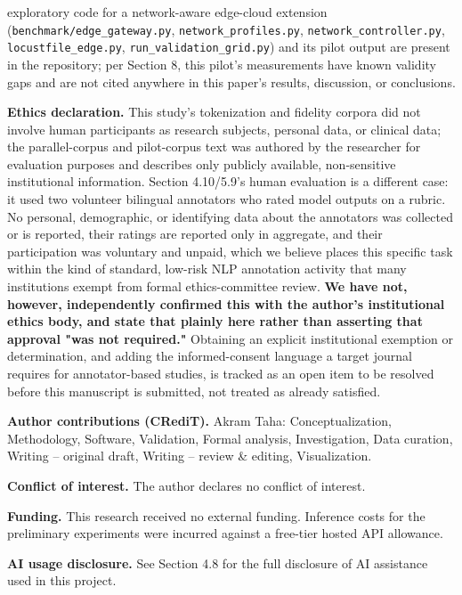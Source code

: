 exploratory code for a network-aware edge-cloud extension (\texttt{benchmark/edge\_gateway.py}, \texttt{network\_profiles.py}, \texttt{network\_controller.py}, \texttt{locustfile\_edge.py}, \texttt{run\_validation\_grid.py}) and its pilot output are present in the repository; per Section 8, this pilot's measurements have known validity gaps and are not cited anywhere in this paper's results, discussion, or conclusions.

\textbf{Ethics declaration.} This study's tokenization and fidelity corpora did not involve human participants as research subjects, personal data, or clinical data; the parallel-corpus and pilot-corpus text was authored by the researcher for evaluation purposes and describes only publicly available, non-sensitive institutional information. Section 4.10/5.9's human evaluation is a different case: it used two volunteer bilingual annotators who rated model outputs on a rubric. No personal, demographic, or identifying data about the annotators was collected or is reported, their ratings are reported only in aggregate, and their participation was voluntary and unpaid, which we believe places this specific task within the kind of standard, low-risk NLP annotation activity that many institutions exempt from formal ethics-committee review. \textbf{We have not, however, independently confirmed this with the author's institutional ethics body, and state that plainly here rather than asserting that approval "was not required."} Obtaining an explicit institutional exemption or determination, and adding the informed-consent language a target journal requires for annotator-based studies, is tracked as an open item to be resolved before this manuscript is submitted, not treated as already satisfied.

\textbf{Author contributions (CRediT).} Akram Taha: Conceptualization, Methodology, Software, Validation, Formal analysis, Investigation, Data curation, Writing -- original draft, Writing -- review \& editing, Visualization.

\textbf{Conflict of interest.} The author declares no conflict of interest.

\textbf{Funding.} This research received no external funding. Inference costs for the preliminary experiments were incurred against a free-tier hosted API allowance.

\textbf{AI usage disclosure.} See Section 4.8 for the full disclosure of AI assistance used in this project.


